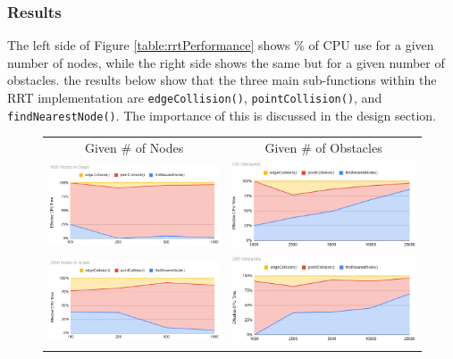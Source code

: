 \newpage

\subsubsection{Results}
The left side of Figure \ref{table:rrtPerformance} shows \% of CPU use for a given number of nodes, while the right side shows the same but for a given number of obstacles. the results below show that the three main sub-functions within the \ac{RRT} implementation are \texttt{edgeCollision()}, \texttt{pointCollision()}, and \texttt{findNearestNode()}. The importance of this is discussed in the design section.
\begin{figure}[H]
\begin{center}
\begin{tabular}{c | c}
Given \# of Nodes                                           & Given \# of Obstacles \\  
\includegraphics[width=0.45\linewidth]{../master/rrt/img/performance/nodes/1000nodes.png} & \includegraphics[width=0.45\linewidth]{../master/rrt/img/performance/obs/100obs.png} \\
\includegraphics[width=0.45\linewidth]{../master/rrt/img/performance/nodes/2500nodes.png} & \includegraphics[width=0.45\linewidth]{../master/rrt/img/performance/obs/250obs.png} \\

\end{tabular}
\end{center}
\end{figure}
